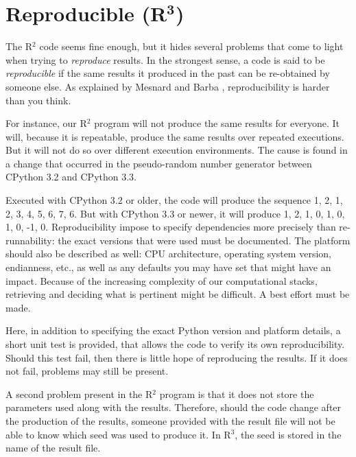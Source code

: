 \clearpage
\section*{Reproducible (R$^{\mathbf 3}$)}

The R$^2$ code seems fine enough, 
but it hides several problems that come to light when trying to {\em reproduce} results.
In the strongest sense,
a code is said to be {\em reproducible}
if the same results it produced in the past can be re-obtained by someone else. As explained by Mesnard and Barba \cite{Mesnard:2016}, 
reproducibility is harder than you think. 

For instance, our R$^2$ program will not produce the same results for everyone. It will, because it is repeatable, produce the same results over repeated executions. But it will not do so over different execution environments. The cause is found in a change that occurred in the pseudo-random number generator between CPython 3.2 and CPython 3.3. 

Executed with CPython 3.2 or older, the code will produce the sequence 1, 2, 1, 2, 3, 4, 5, 6, 7, 6. But with CPython 3.3 or newer, it will produce 1, 2, 1, 0, 1, 0, 1, 0, -1, 0. Reproducibility impose to specify dependencies more precisely than re-runnability: the exact versions that were used must be documented. The platform should also be described as well: CPU architecture, operating system version, endianness, etc., as well as any defaults you may have set that might have an impact. Because of the increasing complexity of our computational stacks, retrieving and deciding what is pertinent might be difficult. A best effort must be made. 

Here, in addition to specifying the exact Python version and platform details, a short unit test is provided, that allows the code to verify its own reproducibility. Should this test fail, then there is little hope of reproducing the results. If it does not fail, problems may still be present. 

A second problem present in the R$^2$ program is that it does not store the parameters used along with the results. Therefore, should the code change after the production of the results, someone provided with the result file will not be able to know which seed was used to produce it. In R$^3$, the seed is stored in the name of the result file.


